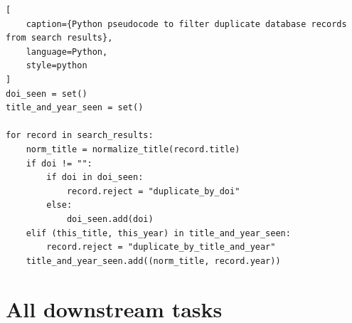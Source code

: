 \documentclass[referee,pdflatex,sn-mathphys-num]{sn-jnl}%
\begin{document}
\begin{appendices}
\begin{minipage}{\linewidth}
\begin{singlespace}
\begin{lstlisting}[
    caption={Python pseudocode to filter duplicate database records from search results},
    language=Python,
    style=python
]
doi_seen = set()
title_and_year_seen = set()

for record in search_results:
    norm_title = normalize_title(record.title)
    if doi != "":
        if doi in doi_seen:
            record.reject = "duplicate_by_doi"
        else:
            doi_seen.add(doi)
    elif (this_title, this_year) in title_and_year_seen:
        record.reject = "duplicate_by_title_and_year"
    title_and_year_seen.add((norm_title, record.year))
\end{lstlisting}
\end{singlespace}
\end{minipage}


\section{All downstream tasks}
\label{app:downstream_tasks}
\begin{table}[!htb]
    \captionsetup{width=\textwidth}
    \caption{List of all downstream tasks and their number of occurrences.}
    
\end{table}

\end{appendices}

\end{document}

